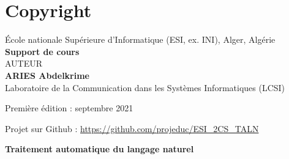\documentclass[12pt]{book}
\begin{document}
\fi



\chapter*{Copyright}

\begin{center}
	École nationale Supérieure d'Informatique (ESI, ex. INI), Alger, Algérie \\
	\textbf{Support de cours} \\[1cm]
	{\Large AUTEUR}\\[.5cm]
	{\LARGE\bfseries ARIES Abdelkrime}\\
	Laboratoire de la Communication dans les Systèmes Informatiques (LCSI)
\end{center}

Première édition : septembre 2021

Projet sur Github : \url{https://github.com/projeduc/ESI_2CS_TALN}


\begin{center}
	{\Huge \textbf{Traitement automatique du langage naturel}}
\end{center}
\end{document}
